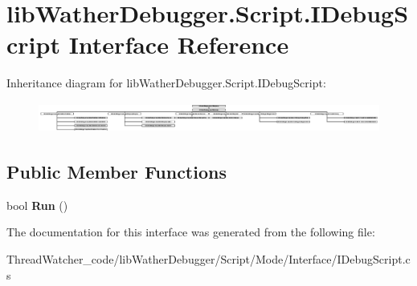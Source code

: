 \hypertarget{interfacelib_wather_debugger_1_1_script_1_1_i_debug_script}{\section{lib\+Wather\+Debugger.\+Script.\+I\+Debug\+Script Interface Reference}
\label{interfacelib_wather_debugger_1_1_script_1_1_i_debug_script}
}
Inheritance diagram for lib\+Wather\+Debugger.\+Script.\+I\+Debug\+Script\+:\begin{figure}[H]
\begin{center}
\leavevmode
\includegraphics[height=1.007712cm]{interfacelib_wather_debugger_1_1_script_1_1_i_debug_script}
\end{center}
\end{figure}
\subsection*{Public Member Functions}
\begin{DoxyCompactItemize}
\item 
\hypertarget{interfacelib_wather_debugger_1_1_script_1_1_i_debug_script_a7fb2620e72af9c433ea0f691ef4f5f76}{bool {\bfseries Run} ()}\label{interfacelib_wather_debugger_1_1_script_1_1_i_debug_script_a7fb2620e72af9c433ea0f691ef4f5f76}

\end{DoxyCompactItemize}


The documentation for this interface was generated from the following file\+:\begin{DoxyCompactItemize}
\item 
Thread\+Watcher\+\_\+code/lib\+Wather\+Debugger/\+Script/\+Mode/\+Interface/I\+Debug\+Script.\+cs\end{DoxyCompactItemize}
